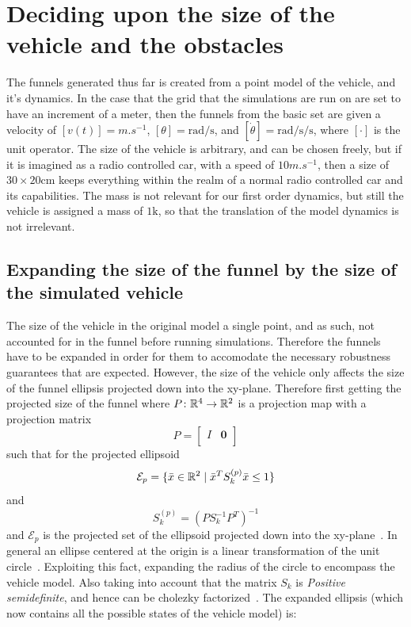 \section{Deciding upon the size of the vehicle and the obstacles}

The funnels generated thus far is created from a point model of the vehicle, and
it's dynamics. In the case that the grid that the simulations are run on are set
to have an increment of a meter, then the funnels from the basic set are given a
velocity of \([v(t)] = \si{m.s^{-1}}\), \([\theta] = \si{\radian\per\second}\),
and \([\dot{\theta}] = \si{\radian\per\second\per\second}\), where \([\cdot]\)
is the unit operator. The size of the vehicle is arbitrary, and can be chosen
freely, but if it is imagined as a radio controlled car, with a speed of
\(10\si{m.s^{-1}}\), then a size of \(30 \times 20 \si{\centi\metre} \) keeps
everything within the realm of a normal radio controlled car and its
capabilities. The mass is not relevant for our first order dynamics, but still
the vehicle is assigned a mass of \(1 \si{\kilo}\), so that the translation of
the model dynamics is not irrelevant.

\subsection{Expanding the size of the funnel by the size of the simulated
  vehicle}

The size of the vehicle in the original model a single point, and as such, not
accounted for in the funnel before running simulations. Therefore the funnels
have to be expanded in order for them to accomodate the necessary robustness
guarantees that are expected. However, the size of the vehicle only affects the
size of the funnel ellipsis projected down into the xy-plane. Therefore first
getting the projected size of the funnel where \(P \colon \mathbb{R}^4 \rightarrow
\mathbb{R}^2\) is a projection map with a projection matrix
\[
  P =
  \begin{bmatrix}
    I & \mathbf{0} \\
  \end{bmatrix}
\]
such that for the projected ellipsoid
\[
  \mathcal{E}_{p} = \lbrace\bar{x} \in \mathbb{R}^{2} \mid {\bar{x}}^{T}S_{k}^{(p)}\bar{x}
    \leq 1\rbrace
\]
and
\[
  S_{k}^{(p)} = \left( PS_{k}^{-1}P^T \right)^{-1}
\]
and \(\mathcal{E}_{p}\) is the projected set of the ellipsoid projected down
into the xy-plane~\cite{majumdarFunnelLibrariesRealtime2017}. In general an
ellipse centered at the origin is a linear transformation of the unit
circle~\cite{lay2005linear}. Exploiting this fact, expanding the radius of the
circle to encompass the vehicle model. Also taking into account that the matrix
\(S_{k}\) is \textit{Positive semidefinite}, and hence can be cholezky
factorized~\cite{lay2005linear}. The expanded ellipsis (which now contains all
the possible states of the vehicle model) is:

